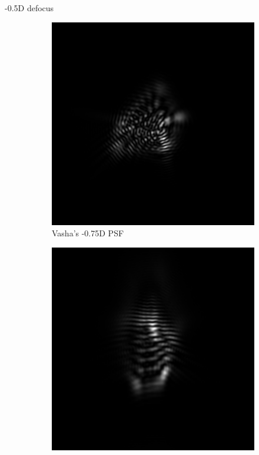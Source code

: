 \documentclass{article}
\begin{document}
-0.5D defocus
\begin{figure}[H]

\begin{subfigure}{.3\textwidth}
  \centering
  \includegraphics[width=1\linewidth]{Vasha_R_G_0530_2_500_zer_-05_5_PSF.png}
  \caption{Vasha's -0.75D PSF}
  \label{fig:vashan05dpsf}
\end{subfigure}
\begin{subfigure}{.3\textwidth}
  \centering
  \includegraphics[width=1\linewidth]{Liz_R_G_0523_2_500_zer_-05_5_PSF.png}

\end{subfigure}
\end{figure}
\end{document}
